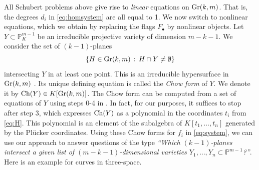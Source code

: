 \documentclass[12pt]{article}
\theoremstyle{definition}
\theoremstyle{remark}
\begin{document}
All Schubert problems above give rise to \emph{linear} equations on ${\rm Gr}(k,m)$. That is, the degrees $d_i$ in \eqref{eq:homsystem} are all equal to 1. We now switch to nonlinear equations, which we obtain by replacing the flags $F_\bullet$ by nonlinear objects. Let $Y \subset \mathbb{P}_K^{m-1}$ be an irreducible projective variety of dimension $m-k-1$. We consider the set of $(k-1)$-planes
\[ \{ H \in {\rm Gr}(k,m) \, : \, H \cap Y \neq \emptyset \}\]
intersecting $Y$ in at least one point. This is an irreducible hypersurface in ${\rm Gr}(k,m)$ \cite[Theorem 1.1]{dalbec1995introduction}. Its unique defining equation is called the \emph{Chow form} of $Y$. We denote it by ${\rm Ch}(Y) \in K[{\rm Gr}(k,m)]$. The Chow form can be computed from a set of equations of $Y$ using steps 0-4 in \cite[Section 3.1]{dalbec1995introduction}. In fact, for our purposes, it suffices to stop after step 3, which expresses ${\rm Ch}(Y)$ as a polynomial in the coordinates $t_i$ from \eqref{eq:H}. This polynomial is an element of the subalgebra of $K[t_1, \ldots, t_n]$ generated by the Pl\"ucker coordinates. Using these Chow forms for $f_i$ in \eqref{eq:system}, we can use our approach to answer questions of the type \emph{``Which $(k-1)$-planes intersect a given list of $(m-k-1)$-dimensional varieties $Y_1, \ldots, Y_n \subset \mathbb{P}^{m-1}$?''}. Here is an example for curves in three-space. 
\end{document}
